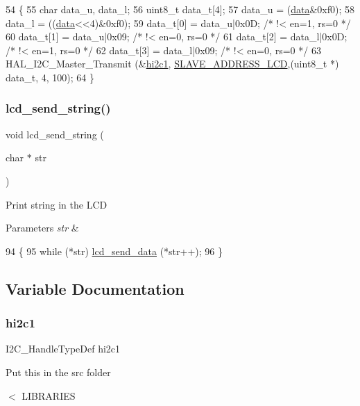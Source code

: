 \begin{DoxyCode}
54 \{
55     \textcolor{keywordtype}{char} data\_u, data\_l;
56     uint8\_t data\_t[4];
57     data\_u = (\hyperlink{main_8c_a7f897df1949af68456ee830f2468e476}{data}&0xf0);
58     data\_l = ((\hyperlink{main_8c_a7f897df1949af68456ee830f2468e476}{data}<<4)&0xf0);
59     data\_t[0] = data\_u|0x0D;  \textcolor{comment}{/* !< en=1, rs=0 */}
60     data\_t[1] = data\_u|0x09;  \textcolor{comment}{/* !< en=0, rs=0 */}
61     data\_t[2] = data\_l|0x0D;  \textcolor{comment}{/* !< en=1, rs=0 */}
62     data\_t[3] = data\_l|0x09;  \textcolor{comment}{/* !< en=0, rs=0 */}
63     HAL\_I2C\_Master\_Transmit (&\hyperlink{i2c-lcd_8c_af7b2c26e44dadaaa798a5c3d82914ba7}{hi2c1}, \hyperlink{i2c-lcd_8c_a16b338f4ba8614530cf7e484066f29c5}{SLAVE\_ADDRESS\_LCD},(uint8\_t *) data\_t, 4, 100);
64 \}
\end{DoxyCode}
\mbox{\label{i2c-lcd_8c_a234ae1cb5d91fa756d1216e3540222ad}} 
\subsubsection{\texorpdfstring{lcd\+\_\+send\+\_\+string()}{lcd\_send\_string()}}
{\footnotesize\ttfamily void lcd\+\_\+send\+\_\+string (\begin{DoxyParamCaption}\item[{char $\ast$}]{str }\end{DoxyParamCaption})}

Print string in the L\+CD 
\begin{DoxyParams}{Parameters}
{\em str} & \\
\hline
\end{DoxyParams}

\begin{DoxyCode}
94 \{
95     \textcolor{keywordflow}{while} (*str) \hyperlink{i2c-lcd_8c_ac6c9650fc3a35bf393a6bf535e6d0b9f}{lcd\_send\_data} (*str++);
96 \}
\end{DoxyCode}


\subsection{Variable Documentation}
\mbox{\label{i2c-lcd_8c_af7b2c26e44dadaaa798a5c3d82914ba7}} 
\subsubsection{\texorpdfstring{hi2c1}{hi2c1}}
{\footnotesize\ttfamily I2\+C\+\_\+\+Handle\+Type\+Def hi2c1}

Put this in the src folder

$<$ L\+I\+B\+R\+A\+R\+I\+ES 